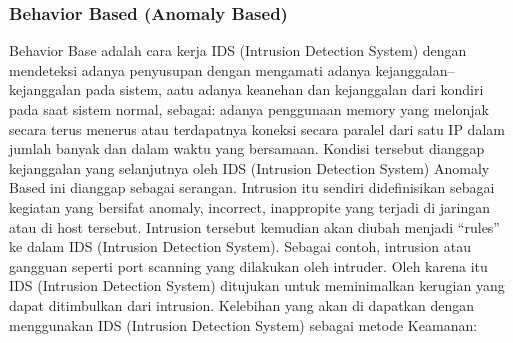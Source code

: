 \documentclass[conference]{IEEEtran}
\begin{document}
\subsubsection{Behavior Based (Anomaly Based)}
Behavior Base adalah cara kerja IDS (Intrusion Detection System) dengan mendeteksi adanya penyusupan dengan mengamati adanya kejanggalan– kejanggalan pada sistem, aatu adanya keanehan dan kejanggalan dari kondiri pada saat sistem normal, sebagai: adanya penggunaan memory yang melonjak secara terus menerus atau terdapatnya koneksi secara paralel dari satu IP dalam jumlah banyak dan dalam waktu yang bersamaan. Kondisi tersebut dianggap kejanggalan yang selanjutnya oleh IDS (Intrusion Detection System) Anomaly Based ini dianggap sebagai serangan. Intrusion itu sendiri didefinisikan sebagai kegiatan yang bersifat anomaly, incorrect, inappropite yang terjadi di jaringan atau di host tersebut. Intrusion tersebut kemudian akan diubah menjadi “rules” ke dalam IDS (Intrusion Detection System). Sebagai contoh, intrusion atau gangguan seperti port scanning yang dilakukan oleh intruder. Oleh karena itu IDS (Intrusion Detection System) ditujukan untuk meminimalkan kerugian yang dapat ditimbulkan dari intrusion. Kelebihan yang akan di dapatkan dengan menggunakan IDS (Intrusion Detection System) sebagai metode Keamanan:
\end{document}
